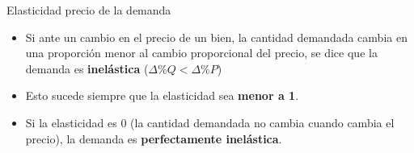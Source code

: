 \documentclass{beamer}
\begin{document}
\begin{frame}{Elasticidad precio de la demanda}
\vspace{2mm}
  \begin{itemize}
    \item Si ante un cambio en el precio de un bien, la cantidad demandada cambia en una proporción menor al cambio proporcional del precio, se dice que la demanda es \textbf{inelástica} ($\Delta \% Q <\Delta \% P$)
    \item Esto sucede siempre que la elasticidad sea \textbf{menor a 1}.
    \item Si la elasticidad es 0 (la cantidad demandada no cambia cuando cambia el precio), la demanda es \textbf{perfectamente inelástica}.
  \end{itemize}
  
\begin{figure}[h]
\centering
\begin{minipage}{0.48\textwidth}
\centering
{}
\end{minipage}
\hfill
\begin{minipage}{0.48\textwidth}
\centering
{}
\end{minipage}

\end{figure}
\end{frame}
\end{document}
